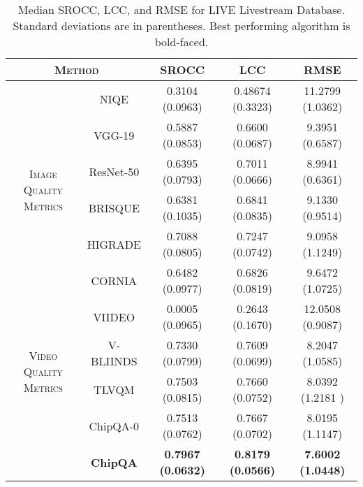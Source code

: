 \documentclass[journal]{IEEEtran}
\begin{document}
\begin{table*}
\caption{Median SROCC, LCC, and RMSE for LIVE Livestream Database. Standard deviations are in parentheses. Best performing algorithm is bold-faced.}
\begin{center}
\begin{tabular}{|c|c|c|c|c|}
\hline
\multicolumn{2}{|c|}{\textsc{Method}}  &  SROCC & LCC & RMSE  \\  
\hline
\multirow{6}{*}{\textsc{Image Quality Metrics}} & NIQE\cite{niqe} & 0.3104 \scriptsize(0.0963) & 0.48674 \scriptsize(0.3323) & 11.2799 \scriptsize(1.0362) \\
\cline{2-5}
& VGG-19\cite{vgg19} & 0.5887 \scriptsize(0.0853) &  0.6600 \scriptsize(0.0687) &  9.3951 \scriptsize(0.6587) \\ 
\cline{2-5}
& ResNet-50\cite{resnet} & 0.6395 \scriptsize(0.0793) & 0.7011 \scriptsize(0.0666) & 8.9941 \scriptsize(0.6361) \\
\cline{2-5}
& BRISQUE\cite{brisque} &  0.6381 \scriptsize(0.1035) & 0.6841 \scriptsize(0.0835) & 9.1330 \scriptsize(0.9514)  \\
\cline{2-5}
& HIGRADE\cite{higrade} & 0.7088 \scriptsize(0.0805) & 0.7247 \scriptsize(0.0742) & 9.0958 \scriptsize(1.1249) \\
\cline{2-5}
& CORNIA\cite{cornia}  & 0.6482 \scriptsize(0.0977) & 0.6826 \scriptsize(0.0819) & 9.6472 \scriptsize(1.0725) \\
\hline
\multirow{4}{*}{\textsc{Video Quality Metrics}} &  VIIDEO\cite{viideo} & 0.0005 \scriptsize(0.0965) & 0.2643 \scriptsize(0.1670) & 12.0508 \scriptsize(0.9087) \\ 
\cline{2-5}
& V-BLIINDS\cite{vbliinds} & 0.7330 \scriptsize(0.0799) & 0.7609 \scriptsize(0.0699) & 8.2047 \scriptsize(1.0585) \\
\cline{2-5}
& TLVQM\cite{tlvqm} &  0.7503 \scriptsize(0.0815) & 0.7660 \scriptsize(0.0752) & 8.0392 \scriptsize(1.2181
)\\
\cline{2-5}
& ChipQA-0\cite{chipqa0} & 0.7513 \scriptsize(0.0762) & 0.7667 \scriptsize(0.0702) & 8.0195 \scriptsize(1.1147) \\
\cline{2-5}
& \textbf{ChipQA} & \textbf{0.7967 \scriptsize(0.0632)} & \textbf{0.8179 \scriptsize(0.0566)} & \textbf{7.6002 \scriptsize(1.0448)} \\
\hline
\end{tabular}
\label{tab:liveapv}
\end{center}
\vspace{-5mm}
\end{table*}
\end{document}
